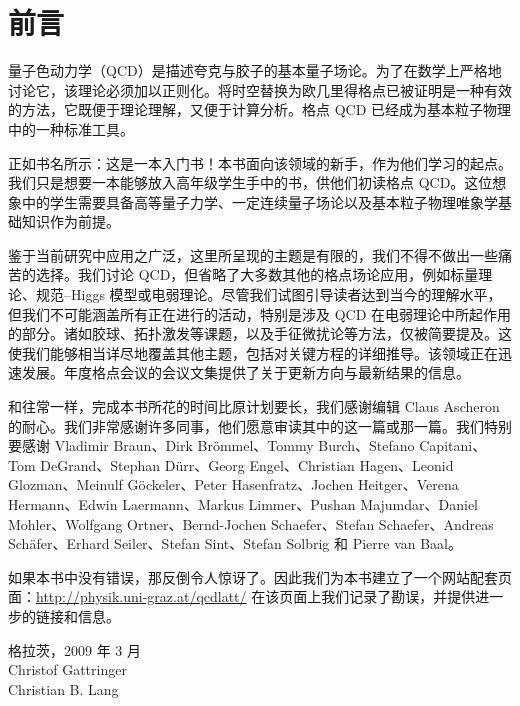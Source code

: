 
\chapter*{前言}

量子色动力学（QCD）是描述夸克与胶子的基本量子场论。为了在数学上严格地讨论它，该理论必须加以正则化。将时空替换为欧几里得格点已被证明是一种有效的方法，它既便于理论理解，又便于计算分析。格点 QCD 已经成为基本粒子物理中的一种标准工具。

正如书名所示：这是一本入门书！本书面向该领域的新手，作为他们学习的起点。我们只是想要一本能够放入高年级学生手中的书，供他们初读格点 QCD。这位想象中的学生需要具备高等量子力学、一定连续量子场论以及基本粒子物理唯象学基础知识作为前提。

鉴于当前研究中应用之广泛，这里所呈现的主题是有限的，我们不得不做出一些痛苦的选择。我们讨论 QCD，但省略了大多数其他的格点场论应用，例如标量理论、规范–Higgs 模型或电弱理论。尽管我们试图引导读者达到当今的理解水平，但我们不可能涵盖所有正在进行的活动，特别是涉及 QCD 在电弱理论中所起作用的部分。诸如胶球、拓扑激发等课题，以及手征微扰论等方法，仅被简要提及。这使我们能够相当详尽地覆盖其他主题，包括对关键方程的详细推导。该领域正在迅速发展。年度格点会议的会议文集提供了关于更新方向与最新结果的信息。

和往常一样，完成本书所花的时间比原计划要长，我们感谢编辑 Claus Ascheron 的耐心。我们非常感谢许多同事，他们愿意审读其中的这一篇或那一篇。我们特别要感谢 Vladimir Braun、Dirk Br\"ommel、Tommy Burch、Stefano Capitani、Tom DeGrand、Stephan D\"urr、Georg Engel、Christian Hagen、Leonid Glozman、Meinulf G\"ockeler、Peter Hasenfratz、Jochen Heitger、Verena Hermann、Edwin Laermann、Markus Limmer、Pushan Majumdar、Daniel Mohler、Wolfgang Ortner、Bernd-Jochen Schaefer、Stefan Schaefer、Andreas Sch\"afer、Erhard Seiler、Stefan Sint、Stefan Solbrig 和 Pierre van Baal。

如果本书中没有错误，那反倒令人惊讶了。因此我们为本书建立了一个网站配套页面：\url{http://physik.uni-graz.at/qcdlatt/}
在该页面上我们记录了勘误，并提供进一步的链接和信息。

\begin{flushright}
格拉茨，2009 年 3 月\\[2mm]
Christof Gattringer\\[1mm]
Christian B. Lang
\end{flushright}
